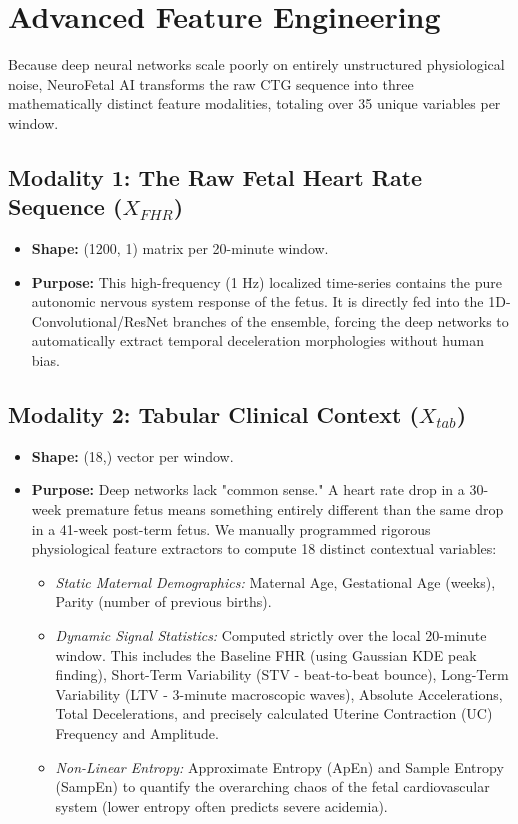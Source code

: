 \documentclass[12pt,a4paper]{report}
\begin{document}
\chapter{Advanced Feature Engineering}
Because deep neural networks scale poorly on entirely unstructured physiological noise, NeuroFetal AI transforms the raw CTG sequence into three mathematically distinct feature modalities, totaling over 35 unique variables per window.

\section{Modality 1: The Raw Fetal Heart Rate Sequence ($X_{FHR}$)}
\begin{itemize}
    \item \textbf{Shape:} (1200, 1) matrix per 20-minute window.
    \item \textbf{Purpose:} This high-frequency (1 Hz) localized time-series contains the pure autonomic nervous system response of the fetus. It is directly fed into the 1D-Convolutional/ResNet branches of the ensemble, forcing the deep networks to automatically extract temporal deceleration morphologies without human bias.
\end{itemize}

\section{Modality 2: Tabular Clinical Context ($X_{tab}$)}
\begin{itemize}
    \item \textbf{Shape:} (18,) vector per window.
    \item \textbf{Purpose:} Deep networks lack "common sense." A heart rate drop in a 30-week premature fetus means something entirely different than the same drop in a 41-week post-term fetus. We manually programmed rigorous physiological feature extractors to compute 18 distinct contextual variables:
    \begin{itemize}
        \item \textit{Static Maternal Demographics:} Maternal Age, Gestational Age (weeks), Parity (number of previous births).
        \item \textit{Dynamic Signal Statistics:} Computed strictly over the local 20-minute window. This includes the Baseline FHR (using Gaussian KDE peak finding), Short-Term Variability (STV - beat-to-beat bounce), Long-Term Variability (LTV - 3-minute macroscopic waves), Absolute Accelerations, Total Decelerations, and precisely calculated Uterine Contraction (UC) Frequency and Amplitude.
        \item \textit{Non-Linear Entropy:} Approximate Entropy (ApEn) and Sample Entropy (SampEn) to quantify the overarching chaos of the fetal cardiovascular system (lower entropy often predicts severe acidemia).
    \end{itemize}
\end{itemize}
\end{document}
